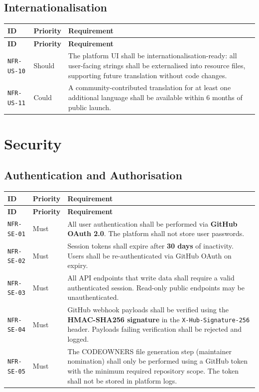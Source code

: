 \documentclass[12pt,a4paper]{article}
\begin{document}
\subsection{Internationalisation}
\begin{longtable}{L{2.2cm} L{1.8cm} L{9.3cm}}
  \color{white}\bfseries ID & \color{white}\bfseries Priority & \color{white}\bfseries Requirement \\
  \endfirsthead
  \color{white}\bfseries ID & \color{white}\bfseries Priority & \color{white}\bfseries Requirement \\
  \endhead\hline
  \texttt{NFR-US-10} & Should & The platform UI shall be internationalisation-ready: all user-facing strings shall be externalised into resource files, supporting future translation without code changes. \\
  \texttt{NFR-US-11} & Could  & A community-contributed translation for at least one additional language shall be available within 6 months of public launch. \\
  \hline
\end{longtable}

\section{Security}

\subsection{Authentication and Authorisation}
\begin{longtable}{L{2.2cm} L{1.8cm} L{9.3cm}}
  \color{white}\bfseries ID & \color{white}\bfseries Priority & \color{white}\bfseries Requirement \\
  \endfirsthead
  \color{white}\bfseries ID & \color{white}\bfseries Priority & \color{white}\bfseries Requirement \\
  \endhead\hline
  \texttt{NFR-SE-01} & Must   & All user authentication shall be performed via \textbf{GitHub OAuth 2.0}. The platform shall not store user passwords. \\
  \texttt{NFR-SE-02} & Must   & Session tokens shall expire after \textbf{30 days} of inactivity. Users shall be re-authenticated via GitHub OAuth on expiry. \\
  \texttt{NFR-SE-03} & Must   & All API endpoints that write data shall require a valid authenticated session. Read-only public endpoints may be unauthenticated. \\
  \texttt{NFR-SE-04} & Must   & GitHub webhook payloads shall be verified using the \textbf{HMAC-SHA256 signature} in the \texttt{X-Hub-Signature-256} header. Payloads failing verification shall be rejected and logged. \\
  \texttt{NFR-SE-05} & Must   & The CODEOWNERS file generation step (maintainer nomination) shall only be performed using a GitHub token with the minimum required repository scope. The token shall not be stored in platform logs. \\
  \hline
\end{longtable}
\end{document}
